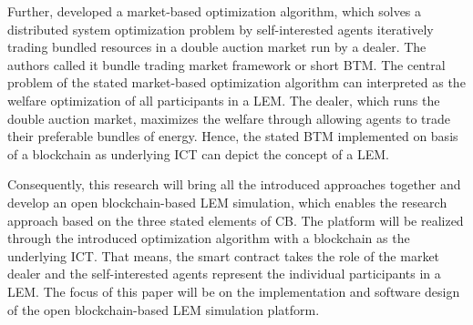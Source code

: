 Further,  developed a market-based optimization algorithm, which solves a distributed system optimization problem by self-interested agents iteratively trading bundled resources in a double auction market run by a dealer. The authors called it bundle trading market framework or short BTM. The central problem of the stated market-based optimization algorithm can interpreted as the welfare optimization of all participants in a LEM. The dealer, which runs the double auction market, maximizes the welfare through allowing agents to trade their preferable bundles of energy. Hence, the stated BTM implemented on basis of a blockchain as underlying ICT can depict the concept of a LEM.

Consequently, this research will bring all the introduced approaches together and develop an open blockchain-based LEM simulation, which enables the research approach based on the three stated elements of CB. The platform will be realized through the introduced optimization algorithm with a blockchain as the underlying ICT. That means, the smart contract takes the role of the market dealer and the self-interested agents represent the individual participants in a LEM. The focus of this paper will be on the implementation and software design of the open blockchain-based LEM simulation platform.

\clearpage